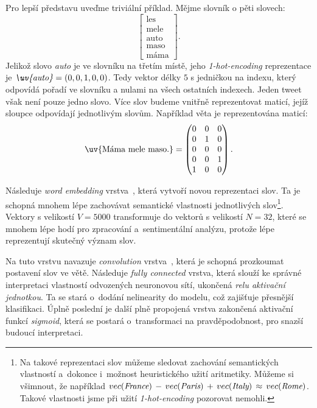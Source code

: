 \documentclass[12pt, a4paper]{article}
\numberwithin{equation}{section} 	%
\begin{document}
Pro lepší představu uveďme triviální příklad. Mějme slovník o pěti slovech:
\begin{equation}
    \begin{bmatrix}
    \text{les} \\
    \text{mele} \\
    \text{auto} \\
    \text{maso} \\
    \text{máma}
    \end{bmatrix}.
\end{equation}
Jelikož slovo \textit{auto} je ve slovníku na třetím místě, jeho \textit{1-hot-encoding} reprezentace je $\text{\textit{\uv{auto}}} = \left(0, 0, 1, 0, 0\right)$. Tedy vektor délky $5$ s jedničkou na indexu, který odpovídá pořadí ve slovníku a nulami na všech ostatních indexech. Jeden tweet však není pouze jedno slovo. Více slov budeme vnitřně reprezentovat maticí, jejíž sloupce odpovídají jednotlivým slovům. Například věta \textit{} je reprezentována maticí:
\begin{equation}
    \text{\uv{Máma mele maso.}} =
    \begin{pmatrix}
        0 & 0 & 0\\
        0 & 1 & 0\\
        0 & 0 & 0\\
        0 & 0 & 1\\
        1 & 0 & 0
    \end{pmatrix}.
\end{equation}

Následuje \textit{word embedding} vrstva~\cite{WordEmbedding1, WordEmbedding2}, která vytvoří novou reprezentaci slov. Ta je schopná mnohem lépe zachovávat semantické vlastnosti jednotlivých slov\footnote{Na takové reprezentaci slov můžeme sledovat zachování semantických vlastností a~dokonce i~možnost heuristického užití aritmetiky. Můžeme si všimnout, že například $vec(\textit{France})\nobreak\hspace{.16667em plus .08333em}-\nobreak\hspace{.16667em plus .08333em} vec(\textit{Paris})\,+\,vec(\textit{Italy})\,\approx\,vec(\textit{Rome})$. Takové vlastnosti jsme při užití \textit{1-hot-encoding} pozorovat nemohli.}. Vektory s velikostí $V = 5000$ transformuje do vektorů s velikostí $N = 32$, které se mnohem lépe hodí pro zpracování a~sentimentální analýzu, protože lépe reprezentují skutečný význam slov.

Na tuto vrstvu navazuje \textit{convolution} vrstva~\cite{CNN}, která je schopná prozkoumat postavení slov ve větě. Následuje \textit{fully connected} vrstva, která slouží ke správné interpretaci vlastností odvozených neuronovou sítí, ukončená \textit{relu aktivační jednotkou}. Ta se stará o~dodání nelinearity do modelu, což zajišťuje přesnější klasifikaci. Úplně poslední je další plně propojená vrstva zakončená aktivační funkcí \textit{sigmoid}, která se postará o~transformaci na pravděpodobnost, pro snazší budoucí interpretaci.
\end{document}
